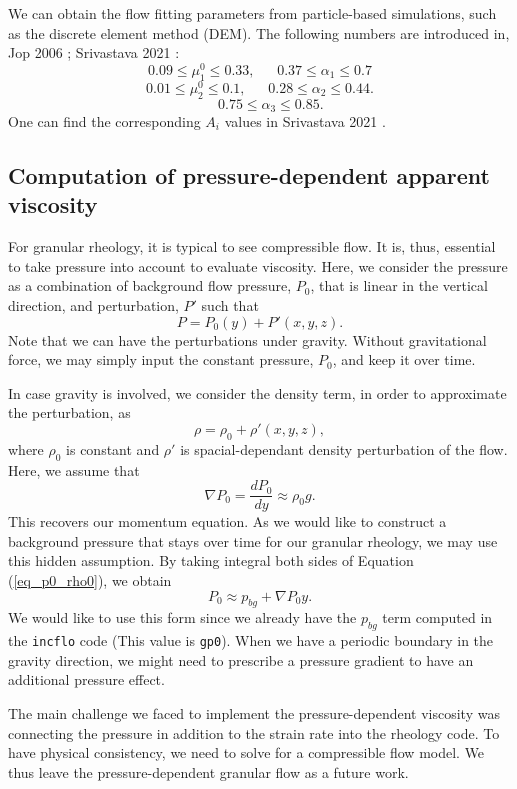 We can obtain the flow fitting parameters from particle-based simulations, such as the discrete element method (DEM). The following numbers are introduced in, Jop 2006 \cite{jop_constitutive_2006}; Srivastava 2021 \cite{srivastava_viscometric_2021}:
    \[
    0.09 \leq \mu_1^0 \leq 0.33, 
    \ \ \ \ \ \ \ 
    0.37 \leq \alpha_1 \leq 0.7
    \]
        \[
    0.01 \leq \mu_2^0 \leq 0.1, 
    \ \ \ \ \ \ \ 
    0.28 \leq \alpha_2 \leq 0.44.
    \]
            \[
    \ \ \ \ \ \ \ 
    0.75 \leq \alpha_3 \leq 0.85.
    \]
     One can find the corresponding $A_i$ values in Srivastava 2021 \cite{srivastava_viscometric_2021}.
\subsection{Computation of pressure-dependent apparent viscosity}
For granular rheology, it is typical to see compressible flow. It is, thus, essential to take pressure into account to evaluate viscosity.
Here, we consider the pressure as a combination of background flow pressure, $P_0$, that is linear in the vertical direction, and perturbation, $P'$ such that
\[
P = P_0(y) + P'(x,y,z).\]
Note that we can have the perturbations under gravity. Without gravitational force, we may simply input the constant pressure, $P_0$, and keep it over time.
\par
In case gravity is involved, we consider the density term, in order to approximate the perturbation, as 
\[
\rho  = \rho_0  + \rho'(x,y,z), 
\]
where $\rho_0$ is constant and $\rho'$ is spacial-dependant density perturbation of the flow. 
Here, we assume that 
\begin{equation}
    \nabla P_0  = \frac{d P_0}{d y} \approx \rho_0  g.  
\label{eq_p0_rho0}
\end{equation}
This recovers our momentum equation. As we would like to construct a background pressure that stays over time for our granular rheology, we may use this hidden assumption.
By taking integral both sides of Equation (\ref{eq_p0_rho0}), we obtain
\begin{equation}
    P_0 \approx p_{bg} + \nabla P_0 y.
\end{equation}
We would like to use this form since we already have the $p_{bg}$ term computed in the \verb+incflo+ code (This value is \verb+gp0+).
%
When we have a periodic boundary in the gravity direction, we might need to prescribe a pressure gradient to have an additional pressure effect. 
\par
The main challenge we faced to implement the pressure-dependent viscosity was connecting the pressure in addition to the strain rate into the rheology code. To have physical consistency, we need to solve for a compressible flow model. We thus leave the pressure-dependent granular flow as a future work.

